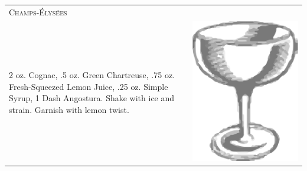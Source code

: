 \documentclass{article}
\begin{document}
\begin{tabular}{p{2in} p{0.5in}}
\multicolumn{2}{p{3in}}{\centering\Huge\textsc{Champs-\'{E}lys\'{e}es}} \\ 
  \vspace{-0.1in}2 oz. Cognac, .5 oz. Green Chartreuse, .75 oz. Fresh-Squeezed Lemon Juice, .25 oz. Simple Syrup, 1 Dash Angostura. Shake with ice and strain.  Garnish with lemon twist.&
  \vspace{-0.1in} \includegraphics{egg_coupe.png}
\end{tabular}
\end{document}
